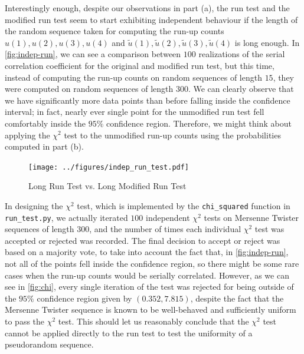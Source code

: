 \documentclass{article}
\begin{document}
\begin{enumerate}
\begin{enumerate}
                Interestingly enough, despite our observations in part (a), the run test and the modified run test seem to start exhibiting independent behaviour
                if the length of the random sequence taken for computing the run-up counts $u(1), u(2), u(3), u(4)$ and $\tilde{u}(1), \tilde{u}(2), \tilde{u}(3), \tilde{u}(4)$
                is long enough. In \autoref{fig:indep-run},
                we can see a comparison between $100$ realizations of the serial correlation coefficient for the original and modified run test,
                but this time, instead of computing the run-up counts on random sequences of length $15$, they were computed on random sequences of length $300$.
                We can clearly observe that we have significantly more data points than before falling inside the confidence interval;
                in fact, nearly ever single point for the unmodified run test fell comfortably inside the $95\%$ confidence region.
                Therefore, we might think about applying the $\chi^2$ test to the unmodified run-up counts using the probabilities computed in part (b).

                \begin{figure}[H]
                    \centering
                    \caption{Long Run Test vs. Long Modified Run Test}
                    \texttt{[image: ../figures/indep\_run\_test.pdf]}
                    \label{fig:indep-run}
                \end{figure}

                In designing the $\chi^2$ test, which is implemented by the \texttt{chi\_squared} function in \texttt{run\_test.py}, we actually iterated $100$
                independent $\chi^2$ tests on Mersenne Twister sequences of length $300$, and the number of times each individual $\chi^2$ test was accepted or rejected
                was recorded.
                The final decision to accept or reject was based on a majority vote, to take into account the fact that, in \autoref{fig:indep-run},
                not all of the points fell inside the confidence region, so there might be some rare cases when the run-up counts would be serially correlated.
                However, as we can see in \autoref{fig:chi}, every single iteration of the test was rejected for being outside of the $95\%$ confidence region
                given by $(0.352, 7.815)$, despite the fact that the Mersenne Twister sequence is known to be well-behaved and sufficiently uniform to pass the $\chi^2$ test.
                This should let us reasonably conclude that the $\chi^2$ test cannot be applied directly to the run test to test the uniformity of a pseudorandom sequence.


\end{enumerate}
\end{enumerate}
\end{document}
